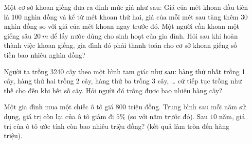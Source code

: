 \begin{bt}%
 
	Một cơ sở khoan giếng đưa ra định mức giá như sau: Giá của mét khoan đầu tiên là 100 nghìn đồng và kể từ mét khoan thứ hai, giá của mỗi mét sau tăng thêm 30 nghìn đồng so với giá của mét khoan ngay trước đó. Một người cần khoan một giếng sâu ${20 {~m}}$ để lấy nước dùng cho sinh hoạt của gia đình. Hỏi sau khi hoàn thành việc khoan giếng, gia đình đó phải thanh toán cho cơ sở khoan giếng số tiền bao nhiêu nghìn đồng?
\end{bt}

\begin{bt}%
 
	Người ta trồng 3240 cây theo một hình tam giác như sau: hàng thứ nhất trồng 1 cây, hàng thứ hai trồng 2 cây, hàng thứ ba trồng 3 cây, … cứ tiếp tục trồng như thế cho đến khi hết số cây. Hỏi người đó trồng được bao nhiêu hàng cây?
\end{bt}

\begin{bt}%

Một gia đình mua một chiếc ô tô giá $800$ triệu đồng. Trung bình sau mỗi năm sử dụng, giá trị còn lại của ô tô giảm đi $5\%$ (so với năm trước đó). Sau $10$ năm, giá trị của ô tô ước tính còn bao nhiêu triệu đồng? (kết quả làm tròn đến hàng triệu).
\end{bt}

